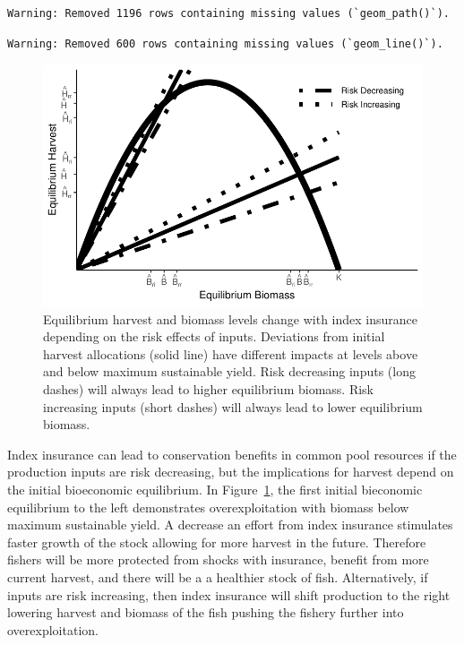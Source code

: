 \documentclass[
  super,
  preprint,
  3p]{elsarticle}
\theoremstyle{plain}
\theoremstyle{plain}
\theoremstyle{remark}
\begin{document}
\begin{verbatim}
Warning: Removed 1196 rows containing missing values (`geom_path()`).
\end{verbatim}

\begin{verbatim}
Warning: Removed 600 rows containing missing values (`geom_line()`).
\end{verbatim}

\begin{figure}[H]

{\centering \includegraphics{index-bc_files/figure-pdf/fig-synas-1.pdf}

}

\caption{\label{fig-synas}Equilibrium harvest and biomass levels change
with index insurance depending on the risk effects of inputs. Deviations
from initial harvest allocations (solid line) have different impacts at
levels above and below maximum sustainable yield. Risk decreasing inputs
(long dashes) will always lead to higher equilibrium biomass. Risk
increasing inputs (short dashes) will always lead to lower equilibrium
biomass.}

\end{figure}

Index insurance can lead to conservation benefits in common pool
resources if the production inputs are risk decreasing, but the
implications for harvest depend on the initial bioeconomic equilibrium.
In Figure~\ref{fig-synas}, the first initial bieconomic equilibrium to
the left demonstrates overexploitation with biomass below maximum
sustainable yield. A decrease an effort from index insurance stimulates
faster growth of the stock allowing for more harvest in the future.
Therefore fishers will be more protected from shocks with insurance,
benefit from more current harvest, and there will be a a healthier stock
of fish. Alternatively, if inputs are risk increasing, then index
insurance will shift production to the right lowering harvest and
biomass of the fish pushing the fishery further into overexploitation.
\end{document}
